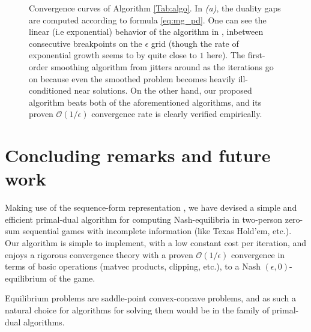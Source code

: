 \documentclass[a4paper,9pt]{extarticle}
\begin{document}
\begin{figure}[!htpb]
  \caption{Convergence curves of Algorithm
    \ref{Tab:algo}. In \textit{(a)}, the duality gaps
    are computed according to formula \eqref{eq:mg_pd}. One can see
    the linear (i.e exponential) behavior of the algorithm in
    \cite{gilpinfirst}, inbetween consecutive breakpoints on the
    $\epsilon$ grid (though the rate of exponential growth seems to by
    quite close to $1$ here). The first-order smoothing algorithm from
    \cite{nesterov2005a} jitters around as the iterations go on
    because even the smoothed problem becomes heavily ill-conditioned
    near solutions. On the other hand, our proposed
    algorithm beats both of the aforementioned algorithms, and
  its proven $\mathcal{O}(1/\epsilon)$ convergence rate is clearly
  verified empirically.}
  \label{Tab:dgap_curve}
\end{figure}

\section{Concluding remarks and future work}
Making use of the sequence-form representation
\cite{koller1992complexity,von1996efficient,vonequilibrium}, we have
devised a simple and efficient primal-dual algorithm for computing
Nash-equilibria in two-person zero-sum sequential games with
incomplete information (like Texas Hold'em, etc.). Our algorithm is
simple to implement, with a low constant cost per iteration, and
enjoys a rigorous convergence theory with a proven
$\mathcal{O}(1/\epsilon)$ convergence in terms of basic operations
(matvec products, clipping, etc.), to a Nash
$(\epsilon,0)$-equilibrium of the game.

Equilibrium problems are saddle-point convex-concave problems, and as
such a natural choice for algorithms for solving them would be in the
family of primal-dual algorithms. %


\end{document}
